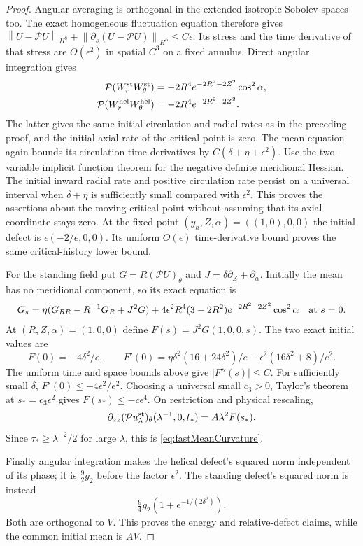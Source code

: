 \documentclass[11pt]{article}
\theoremstyle{remark}
\newcommand{\PP}{\mathcal P}
\newcommand{\norm}[1]{\left\lVert#1\right\rVert}
\begin{document}
\begin{proof}
Angular averaging is orthogonal in the extended isotropic Sobolev
spaces too. The exact homogeneous fluctuation equation therefore gives
$\norm{U-\PP U}_{H^8}+\norm{\partial_s(U-\PP U)}_{H^6}
\leq C\epsilon$. Its stress and the time derivative of that stress
are $O(\epsilon^2)$ in spatial $C^3$ on a fixed annulus.
Direct angular integration gives
\begin{align}
 \PP(W^{\rm st}_rW^{\rm st}_\theta)
     &=-2R^4e^{-2R^2-2Z^2}\cos^2\alpha,\label{eq:standingstress}\\
 \PP(W^{\rm hel}_rW^{\rm hel}_\theta)
     &=-2R^4e^{-2R^2-2Z^2}.\label{eq:helicalstress}
\end{align}
The latter gives the same initial circulation and radial rates as
in the preceding proof, and the initial axial rate of the critical
point is zero. The mean equation again bounds its circulation time
derivatives by $C(\delta+\eta+\epsilon^2)$.
Use the two-variable implicit function theorem for the negative
definite meridional Hessian. The initial inward radial rate and positive
circulation rate persist on a universal interval when
$\delta+\eta$ is sufficiently small compared with $\epsilon^2$.
This proves the assertions about the moving critical point without
assuming that its axial coordinate stays zero. At the fixed point
$(y_h,Z,\alpha)=((1,0),0,0)$ the initial defect is
$\epsilon(-2/e,0,0)$. Its uniform $O(\epsilon)$ time-derivative bound
proves the same critical-history lower bound.

For the standing field put $G=R(\PP U)_\theta$ and
$J=\delta\partial_Z+\partial_\alpha$.
Initially the mean has no meridional component, so its exact equation is
\[
 G_s=\eta(G_{RR}-R^{-1}G_R+J^2G)
        +4\epsilon^2R^4(3-2R^2)e^{-2R^2-2Z^2}\cos^2\alpha
                          \quad\hbox{at }s=0.
\]
At $(R,Z,\alpha)=(1,0,0)$ define $F(s)=J^2G(1,0,0,s)$.
The two exact initial values are
\[
 F(0)=-4\delta^2/e,\qquad
 F'(0)=\eta\delta^2(16+24\delta^2)/e
                     -\epsilon^2(16\delta^2+8)/e^2.
\]
The uniform time and space bounds above give $|F''(s)|\leq C$.
For sufficiently small $\delta$, $F'(0)\leq-4\epsilon^2/e^2$.
Choosing a universal small $c_3>0$, Taylor's theorem at
$s_*=c_3\epsilon^2$ gives $F(s_*)\leq-c\epsilon^4$.
On restriction and physical rescaling,
\[
 \partial_{zz}(\PP u^{\rm st}_\lambda)_\theta
                 (\lambda^{-1},0,t_*)=A\lambda^2F(s_*).
\]
Since $\tau_*\geq\lambda^{-2}/2$ for large $\lambda$, this is
\eqref{eq:fastMeanCurvature}.

Finally angular integration makes the helical defect's squared norm
independent of its phase; it is $\tfrac92 g_2$ before the factor
$\epsilon^2$. The standing defect's squared norm is instead
\[
 \tfrac94 g_2(1+e^{-1/(2\delta^2)}).
\]
Both are orthogonal to $V$. This proves the energy and relative-defect
claims, while the common initial mean is $A V$.
\end{proof}
\end{document}
